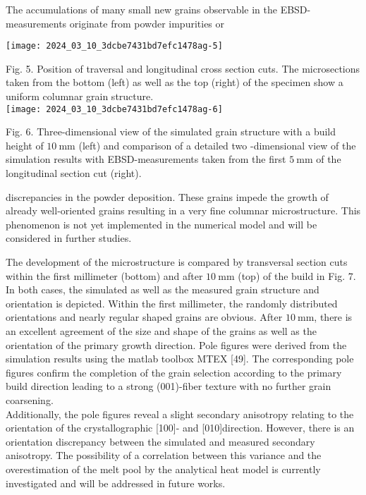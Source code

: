 \documentclass[10pt]{article}
\begin{document}
The accumulations of many small new grains observable in the EBSD-measurements originate from powder impurities or

\begin{center}
\texttt{[image: 2024\_03\_10\_3dcbe7431bd7efc1478ag-5]}
\end{center}

Fig. 5. Position of traversal and longitudinal cross section cuts. The microsections taken from the bottom (left) as well as the top (right) of the specimen show a uniform columnar grain structure.\\
\texttt{[image: 2024\_03\_10\_3dcbe7431bd7efc1478ag-6]}

Fig. 6. Three-dimensional view of the simulated grain structure with a build height of $10 \mathrm{~mm}$ (left) and comparison of a detailed two -dimensional view of the simulation results with EBSD-measurements taken from the first $5 \mathrm{~mm}$ of the longitudinal section cut (right).

discrepancies in the powder deposition. These grains impede the growth of already well-oriented grains resulting in a very fine columnar microstructure. This phenomenon is not yet implemented in the numerical model and will be considered in further studies.

The development of the microstructure is compared by transversal section cuts within the first millimeter (bottom) and after $10 \mathrm{~mm}$ (top) of the build in Fig. 7. In both cases, the simulated as well as the measured grain structure and orientation is depicted. Within the first millimeter, the randomly distributed orientations and nearly regular shaped grains are obvious. After $10 \mathrm{~mm}$, there is an excellent agreement of the size and shape of the grains as well as the orientation of the primary growth direction. Pole figures were derived from the simulation results using the matlab toolbox MTEX [49]. The corresponding pole figures confirm the completion of the grain selection according to the primary build direction leading to a strong (001)-fiber texture with no further grain coarsening.\\
Additionally, the pole figures reveal a slight secondary anisotropy relating to the orientation of the crystallographic [100]- and [010]direction. However, there is an orientation discrepancy between the simulated and measured secondary anisotropy. The possibility of a correlation between this variance and the overestimation of the melt pool by the analytical heat model is currently investigated and will be addressed in future works.
\end{document}
